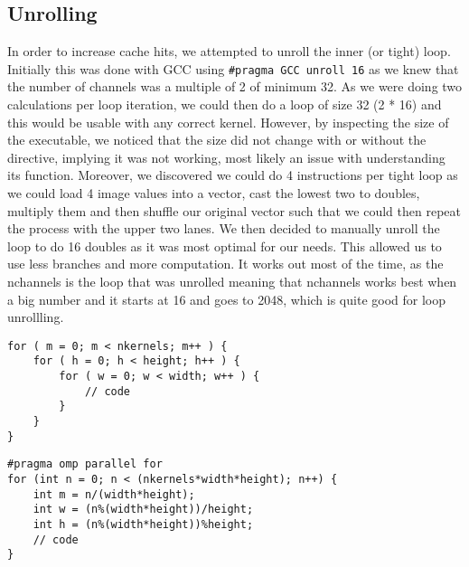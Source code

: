 \documentclass[12pt,fleqn,leqno,letterpaper]{article}
\begin{document}
\subsection{Unrolling}
In order to increase cache hits, we attempted to unroll the inner (or tight) loop. Initially this was done 
with GCC using \lstinline{#pragma GCC unroll 16} as we knew that the number of channels was a multiple of 2 of minimum 32.
As we were doing two calculations per loop iteration, we could then do a loop of size 32 (2 * 16) and this would
be usable with any correct kernel. However, by inspecting the size of the executable, we noticed that the size did not change
with or without the directive, implying it was not working, most likely an issue with understanding its function. 
Moreover, we discovered we could do 4 instructions per tight loop as we could load 4 image values into a vector, 
cast the lowest two to doubles, multiply them and then shuffle our original vector such that we could then repeat 
the process with the upper two lanes. We then decided to manually unroll the loop to do 16 doubles as it was most 
optimal for our needs. This allowed us to use less branches and more computation. It works out most of the time, 
as the nchannels is the loop that was unrolled meaning that nchannels works best when a big number and it starts at
16 and goes to 2048, which is quite good for loop unrollling. 

\begin{verbatim}
for ( m = 0; m < nkernels; m++ ) {
    for ( h = 0; h < height; h++ ) {
        for ( w = 0; w < width; w++ ) {
            // code
        }
    }
}
\end{verbatim}

\begin{verbatim}
#pragma omp parallel for
for (int n = 0; n < (nkernels*width*height); n++) {
    int m = n/(width*height);
    int w = (n%(width*height))/height;
    int h = (n%(width*height))%height;
    // code
}
\end{verbatim}
\end{document}
